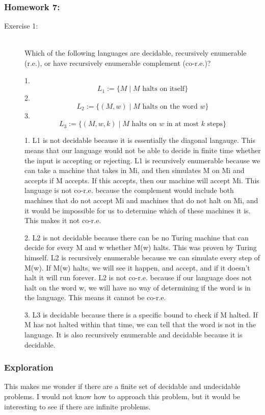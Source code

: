\documentclass{article}
\theoremstyle{theorem}
\theoremstyle{definition}
\theoremstyle{remark}
\begin{document}
\subsubsection{Homework 7:}
\begin{description}
\item[Exercise 1:] \textbf{ }\\
Which of the following languages are decidable, recursively enumerable (r.e.), or have recursively enumerable complement (co-r.e.)?

1. $$L_1 := \{M \; | \; \text{$M$ halts on itself} \}$$
2. $$L_2 := \{(M,w) \; | \; \text{$M$ halts on the word $w$} \}$$
3. $$L_3 := \{(M,w,k) \; | \; \text{$M$ halts on $w$ in at most $k$ steps} \}$$

1. L1 is not decidable because it is essentially the diagonal langauge. This means that our language would not be able to decide in finite time whether the input is accepting or rejecting. L1 is recursively enumerable because we can take a machine that takes in Mi, and then simulates M on Mi and accepts if M accepts. If this accepts, then our machine will accept Mi. This language is not co-r.e. because the complement would include both machines that do not accept Mi and machines that do not halt on Mi, and it would be impossible for us to determine which of these machines it is. This makes it not co-r.e.

2. L2 is not decidable because there can be no Turing machine that can decide for every M and w whether M(w) halts. This was proven by Turing himself. L2 is recursively enumerable because we can simulate every step of M(w). If M(w) halts, we will see it happen, and accept, and if it doesn't halt it will run forever. L2 is not co-r.e. because if our language does not halt on the word w, we will have no way of determining if the word is in the language. This means it cannot be co-r.e.

3. L3 is decidable because there is a specific bound to check if M halted. If M has not halted within that time, we can tell that the word is not in the language. It is also recursively enumerable and decidable because it is decidable.

\end{description}

\subsubsection{Exploration}
This makes me wonder if there are a finite set of decidable and undecidable problems. I would not know how to approach this problem, but it would be interesting to see if there are infinite problems.
\end{document}
